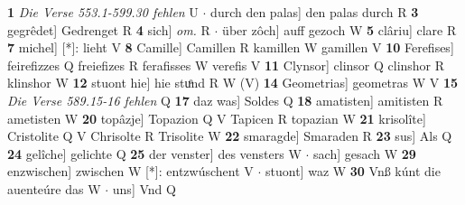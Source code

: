 \documentclass[8pt,a4paper,notitlepage]{article}
\begin{document}
\begin{table}[ht]
\begin{minipage}[t]{0.5\linewidth}
\textbf{1} \textit{Die Verse 553.1-599.30 fehlen} U   $\cdot$ durch den palas] den palas durch R \textbf{3} gegrêdet] Gedrenget R \textbf{4} sich] \textit{om.} R  $\cdot$ über zôch] auff gezoch W \textbf{5} clâriu] clare R \textbf{7} michel] [*]: lieht V \textbf{8} Camille] Camillen R kamillen W gamillen V \textbf{10} Ferefises] feirefizzes Q freiefizes R ferafisses W verefis V \textbf{11} Clynsor] clinsor Q clinshor R klinshor W \textbf{12} stuont hie] hie stuͦnd R W (V) \textbf{14} Geometrias] geometras W V \textbf{15} \textit{Die Verse 589.15-16 fehlen} Q  \textbf{17} daz was] Soldes Q \textbf{18} amatisten] amitisten R ametisten W \textbf{20} topâzje] Topazion Q V Tapicen R topazian W \textbf{21} krisolîte] Cristolite Q V Chrisolte R Trisolite W \textbf{22} smaragde] Smaraden R \textbf{23} sus] Als Q \textbf{24} gelîche] gelichte Q \textbf{25} der venster] des vensters W  $\cdot$ sach] gesach W \textbf{29} enzwischen] zwischen W [*]: entzwúschent V  $\cdot$ stuont] waz W \textbf{30} Vnß kúnt die auenteúre das W  $\cdot$ uns] Vnd Q \newline
\end{minipage}
\end{table}
\end{document}
